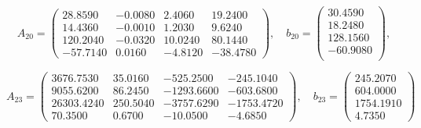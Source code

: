 \documentclass[12pt, a4paper]{article}
\begin{document}
\[
    A_{20} = 
    \begin{pmatrix}
     28.8590    &    -0.0080    &     2.4060    &    19.2400    \\   
     14.4360    &    -0.0010    &     1.2030    &     9.6240    \\   
    120.2040    &    -0.0320    &    10.0240    &    80.1440    \\  
    -57.7140    &     0.0160    &    -4.8120    &   -38.4780       

    \end{pmatrix}, \quad b_{20} = 
    \begin{pmatrix}
    30.4590  \\
    18.2480  \\
    128.1560 \\
    -60.9080 \\
    \end{pmatrix},
\]

\[
    A_{23} = 
    \begin{pmatrix}
        3676.7530 &    35.0160   &    -525.2500 &    -245.1040 \\
        9055.6200  &    86.2450   &   -1293.6600 &   -603.6800  \\
        26303.4240  &    250.5040  &  -3757.6290  &  -1753.4720  \\
        70.3500  &      0.6700  &   -10.0500   &    -4.6850   
    \end{pmatrix}, \quad b_{23} = 
    \begin{pmatrix}
        245.2070 \\
       604.0000  \\
      1754.1910  \\
         4.7350  
    \end{pmatrix}
\]

\newpage
\end{document}
